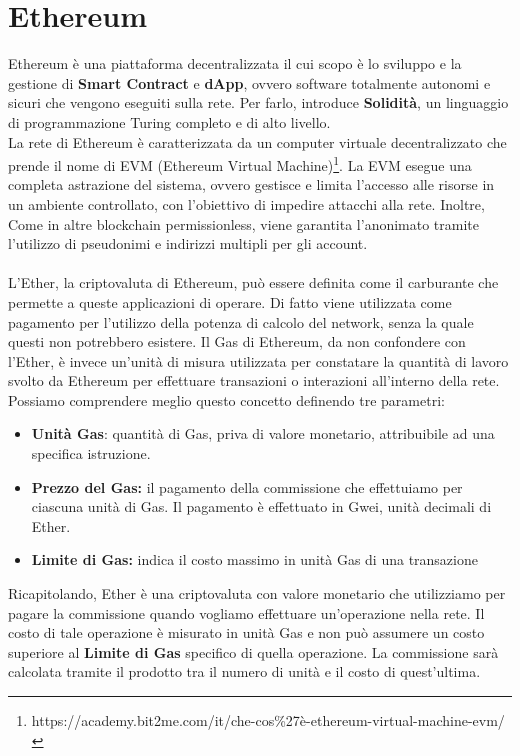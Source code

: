 \section{Ethereum}
Ethereum \cite{pisanu2019Ethereum}\cite{ferretti2020ethereum} è una piattaforma decentralizzata il cui scopo è lo sviluppo e la gestione di \textbf{Smart Contract} \cite{mohanta2018overview} e \textbf{dApp}, ovvero software totalmente autonomi e sicuri che vengono eseguiti sulla rete. Per farlo, introduce \textbf{Solidità}, un linguaggio di programmazione Turing completo e di alto livello.
\\
La rete di Ethereum è caratterizzata da un computer virtuale decentralizzato che prende il nome di EVM (Ethereum Virtual Machine)\footnote{https://academy.bit2me.com/it/che-cos\%27è-ethereum-virtual-machine-evm/}. La EVM esegue una completa astrazione del sistema, ovvero gestisce e limita l'accesso alle risorse in un ambiente controllato, con l'obiettivo di impedire attacchi alla rete. Inoltre, Come in altre blockchain permissionless, viene garantita l'anonimato tramite l'utilizzo di pseudonimi e indirizzi multipli per gli account.
\\
\\
L'Ether, la criptovaluta di Ethereum, può essere definita come il carburante che permette a queste applicazioni di operare. Di fatto viene utilizzata come pagamento per l'utilizzo della potenza di calcolo del network, senza la quale questi non potrebbero esistere.
Il Gas di Ethereum, da non confondere con l'Ether, è invece un'unità di misura utilizzata per constatare la quantità di lavoro svolto da Ethereum per effettuare transazioni o interazioni all'interno della rete. Possiamo comprendere meglio questo concetto definendo tre parametri:

\begin{itemize}
    \item \textbf{Unità Gas}: quantità di Gas, priva di valore monetario, attribuibile ad una specifica istruzione.
    \item \textbf{Prezzo del Gas:} il pagamento della commissione che effettuiamo per ciascuna unità di Gas. Il pagamento è effettuato in Gwei, unità decimali di Ether. 
    \item \textbf{Limite di Gas:} indica il costo massimo in unità Gas di una transazione
\end{itemize}

Ricapitolando, Ether è una criptovaluta con valore monetario che utilizziamo per pagare la commissione quando vogliamo effettuare un'operazione nella rete. Il costo di tale operazione è misurato in unità Gas e non può assumere un costo superiore al \textbf{Limite di Gas} specifico di quella operazione. La commissione sarà calcolata tramite il prodotto tra il numero di unità e il costo di quest'ultima.

